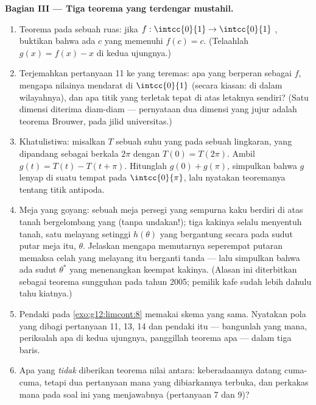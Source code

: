 \begin{problem}
\medskip
\noindent\textbf{Bagian III --- Tiga teorema yang terdengar
mustahil.}
\begin{enumerate}[resume]
  \item Teorema  pada sebuah ruas: jika
        $f : \intcc{0}{1} \to \intcc{0}{1}$ , buktikan
        bahwa ada $c$ yang memenuhi $f(c) = c$. (Telaahlah
        $g(x) = f(x) - x$ di kedua ujungnya.)
  \item Terjemahkan pertanyaan 11 ke  yang teremas: apa yang berperan
        sebagai $f$, mengapa nilainya mendarat di
        $\intcc{0}{1}$ (secara kiasan: di dalam wilayahnya), dan apa
        titik yang terletak tepat di atas letaknya sendiri? (Satu
        dimensi diterima diam-diam --- pernyataan dua dimensi yang jujur
        adalah teorema Brouwer, pada jilid universitas.)
  \item Khatulistiwa: misalkan $T$ sebuah suhu yang  pada sebuah
        lingkaran, yang dipandang sebagai  berkala $2\pi$ dengan
        $T(0) = T(2\pi)$. Ambil $g(t) = T(t) - T(t + \pi)$.
        Hitunglah $g(0) + g(\pi)$, simpulkan bahwa $g$ lenyap
        di suatu tempat pada $\intcc{0}{\pi}$, lalu nyatakan teoremanya
        tentang titik antipoda.
  \item Meja yang goyang: sebuah meja persegi yang sempurna kaku berdiri
        di atas tanah bergelombang yang  (tanpa undakan!); tiga kakinya
        selalu menyentuh tanah, satu melayang setinggi $h(\theta)$ yang
        bergantung secara  pada sudut putar meja itu,
        $\theta$. Jelaskan mengapa memutarnya seperempat putaran memaksa
        celah yang melayang itu berganti tanda --- lalu simpulkan bahwa
        ada sudut $\theta^*$ yang menenangkan keempat kakinya. (Alasan ini
        diterbitkan sebagai teorema sungguhan pada tahun 2005;
        pemilik kafe sudah lebih dahulu tahu kiatnya.)
  \item Pendaki pada \cref{exo:g12:limcont:8} memakai skema yang
        sama. Nyatakan pola yang dibagi pertanyaan 11, 13,
        14 dan pendaki itu --- bangunlah  yang mana, periksalah apa
        di kedua ujungnya, panggillah teorema apa --- dalam tiga baris.
  \item Apa yang \emph{tidak} diberikan teorema nilai antara: keberadaannya
        datang cuma-cuma, tetapi dua pertanyaan mana yang dibiarkannya
        terbuka, dan perkakas mana pada soal ini yang menjawabnya
        (pertanyaan 7 dan 9)?
\end{enumerate}


\end{problem}

